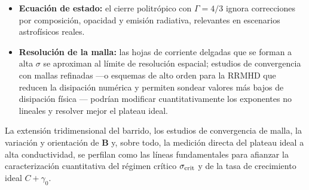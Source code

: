\begin{itemize}
\item \textbf{Ecuación de estado:} el cierre politrópico con $\Gamma = 4/3$ ignora correcciones por composición, opacidad y emisión radiativa, relevantes en escenarios astrofísicos reales.
\item \textbf{Resolución de la malla:} las hojas de corriente delgadas que se forman a alta $\sigma$ se aproximan al límite de resolución espacial; estudios de convergencia con mallas refinadas ---o esquemas de alto orden para la RRMHD que reducen la disipación numérica y permiten sondear valores más bajos de disipación física \parencite{mignone2024}--- podrían modificar cuantitativamente los exponentes no lineales y resolver mejor el plateau ideal.
\end{itemize}

\primerparrafo La extensión tridimensional del barrido, los estudios de convergencia de malla, la variación y orientación de $\mathbf{B}$ y, sobre todo, la medición directa del plateau ideal a alta conductividad, se perfilan como las líneas fundamentales para afianzar la caracterización cuantitativa del régimen crítico $\sigma_{\mathrm{crit}}$ y de la tasa de crecimiento ideal $C+\gamma_0$.
